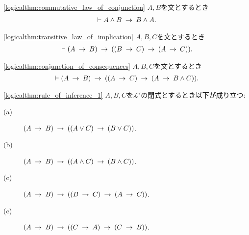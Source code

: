 	\begin{screen}
		\begin{logicalthm}[論理積の可換律]
		\ref{logicalthm:commutative_law_of_conjunction}
			$A,B$を文とするとき
			\begin{align}
				\vdash A \wedge B \rarrow B \wedge A.
			\end{align}
		\end{logicalthm}
	\end{screen}
	
	\begin{screen}
		\begin{logicalthm}[含意の推移律]
		\ref{logicalthm:transitive_law_of_implication}
			$A,B,C$を文とするとき
			\begin{align}
				\vdash (A \rarrow B) \rarrow ((B \rarrow C) \rarrow (A \rarrow C)).
			\end{align}
		\end{logicalthm}
	\end{screen}
	
	\begin{screen}
		\begin{logicalthm}[二式が同時に導かれるならその論理積が導かれる]
		\ref{logicalthm:conjunction_of_consequences}
			$A,B,C$を文とするとき
			\begin{align}
				\vdash (A \rarrow B) \rarrow ((A \rarrow C) 
				\rarrow (A \rarrow B \wedge C)).
			\end{align}
		\end{logicalthm}
	\end{screen}
	
	\begin{screen}
		\begin{logicalthm}[含意は遺伝する]
		\ref{logicalthm:rule_of_inference_1}
			$A,B,C$を$\mathcal{L}'$の閉式とするとき以下が成り立つ:
			\begin{description}
				\item[(a)] $(A \rarrow B) \rarrow ( (A \vee C) \rarrow (B \vee C) )$.
				
				\item[(b)] $(A \rarrow B) \rarrow ( (A \wedge C) \rarrow (B \wedge C) )$.
				
				\item[(c)] $(A \rarrow B) \rarrow ( (B \rarrow C) \rarrow (A \rarrow C) )$.
				
				\item[(c)] $(A \rarrow B) \rarrow ( (C \rarrow A) \rarrow (C \rarrow B) )$.
			\end{description}
		\end{logicalthm}
	\end{screen}
	

